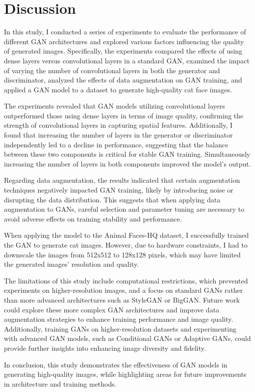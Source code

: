 \section{Discussion}
\label{Discussion}

In this study, I conducted a series of experiments to evaluate the performance of different GAN architectures and explored various factors influencing the quality of generated images. Specifically, the experiments compared the effects of using dense layers versus convolutional layers in a standard GAN, examined the impact of varying the number of convolutional layers in both the generator and discriminator, analyzed the effects of data augmentation on GAN training, and applied a GAN model to a dataset to generate high-quality cat face images.

The experiments revealed that GAN models utilizing convolutional layers outperformed those using dense layers in terms of image quality, confirming the strength of convolutional layers in capturing spatial features. Additionally, I found that increasing the number of layers in the generator or discriminator independently led to a decline in performance, suggesting that the balance between these two components is critical for stable GAN training. Simultaneously increasing the number of layers in both components improved the model's output.

Regarding data augmentation, the results indicated that certain augmentation techniques negatively impacted GAN training, likely by introducing noise or disrupting the data distribution. This suggests that when applying data augmentation to GANs, careful selection and parameter tuning are necessary to avoid adverse effects on training stability and performance.

When applying the model to the Animal Faces-HQ dataset, I successfully trained the GAN to generate cat images. However, due to hardware constraints, I had to downscale the images from 512x512 to 128x128 pixels, which may have limited the generated images' resolution and quality.

The limitations of this study include computational restrictions, which prevented experiments on higher-resolution images, and a focus on standard GANs rather than more advanced architectures such as StyleGAN or BigGAN. Future work could explore these more complex GAN architectures and improve data augmentation strategies to enhance training performance and image quality. Additionally, training GANs on higher-resolution datasets and experimenting with advanced GAN models, such as Conditional GANs or Adaptive GANs, could provide further insights into enhancing image diversity and fidelity.

In conclusion, this study demonstrates the effectiveness of GAN models in generating high-quality images, while highlighting areas for future improvements in architecture and training methods.